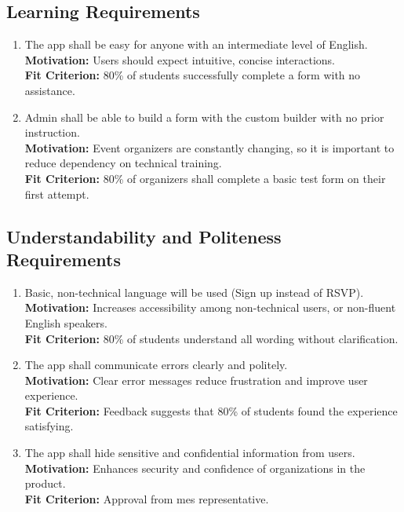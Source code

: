 \documentclass[12pt]{article}
\begin{document}
\subsection{Learning Requirements}
\begin{enumerate}[label=UHR-LR.\arabic*, wide=0pt, leftmargin=*]
  \item The app shall be easy for anyone with an intermediate level of English.\\[2mm]
    {\bf Motivation:} Users should expect intuitive, concise interactions.\\
    {\bf Fit Criterion:} 80\% of students successfully complete a form with no assistance.
  \item Admin shall be able to build a form with the custom builder with no prior instruction.\\[2mm]
    {\bf Motivation:} Event organizers are constantly changing, so it is important to reduce dependency on technical training.\\
    {\bf Fit Criterion:} 80\% of organizers shall complete a basic test form on their first attempt.
\end{enumerate}

\subsection{Understandability and Politeness Requirements}
\begin{enumerate}[label=UHR-UPR.\arabic*, wide=0pt, leftmargin=*]
  \item Basic, non-technical language will be used (Sign up instead of RSVP).\\[2mm]
    {\bf Motivation:} Increases accessibility among non-technical users, or non-fluent English speakers.\\
    {\bf Fit Criterion:} 80\% of students understand all wording without clarification.
  \item The app shall communicate errors clearly and politely.\\[2mm]
    {\bf Motivation:} Clear error messages reduce frustration and improve user experience.\\
    {\bf Fit Criterion:} Feedback suggests that 80\% of students found the experience satisfying.
  \item The app shall hide sensitive and confidential information from users.\\[2mm]
    {\bf Motivation:} Enhances security and confidence of organizations in the product.\\
    {\bf Fit Criterion:} Approval from \gls{mes} representative.
\end{enumerate}
\end{document}
